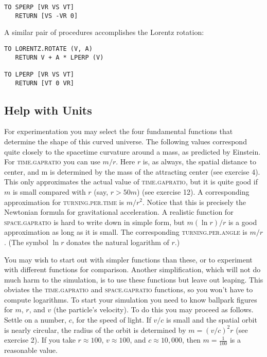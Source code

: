 \documentclass{book}
\begin{document}
\begin{verbatim}
TO SPERP [VR VS VT]
   RETURN [VS -VR 0]
\end{verbatim}
A similar pair of procedures accomplishes the Lorentz rotation:

\begin{verbatim}
TO LORENTZ.ROTATE (V, A)
   RETURN V + A * LPERP (V)

TO LPERP [VR VS VT]
   RETURN [VT 0 VR]
\end{verbatim}
\subsection{Help with Units}

For experimentation you may select the four fundamental functions that
determine the shape of this curved universe. The following values correspond quite closely to the spacetime curvature around a mass, as
predicted by Einstein. For \textsc{time}\textsc{.gapratio} you can use $m / r$. Here $r$
is, as always, the spatial distance to center, and m is determined by the
mass of the attracting center (see exercise 4). This only approximates
the actual value of \textsc{time}\textsc{.gapratio}, but it is quite good if $m$ is small
compared with $r$ (say, $r > 50m$) (see exercise 12). A corresponding approximation for \textsc{turning}\textsc{.per}\textsc{.time} is $m / r^2$. Notice that this is precisely
the Newtonian formula for gravitational acceleration. A realistic function for \textsc{space}\textsc{.gapratio} is hard to write down in simple form, but
$m(\ln r) / r$ is a good approximation as long as it is small. The corresponding \textsc{turning}\textsc{.per}.\textsc{angle} is $m / r$ . (The symbol $\ln r$ donates the natural
logarithm of $r$.)

You may wish to start out with simpler functions than these, or to experiment with different functions for comparison. Another simplification,
which will not do much harm to the simulation, is to use these functions but leave out leaping. This obviates the \textsc{time}\textsc{.gapratio} and
\textsc{space}\textsc{.gapratio} functions, so you won't have to compute logarithms.
To start your simulation you need to know ballpark figures for $m$, $r$,
and $v$ (the particle's velocity). To do this you may proceed as follows.
Settle on a number, $c$, for the speed of light. If $v / c$ is small and the
spatial orbit is nearly circular, the radius of the orbit is determined by
$m = (v/c)^2r$ (see exercise 2). If you take $r \approx 100$, $v \approx 100$, and $c \approx 10,000$, then $m = \frac {1} {100}$ is a reasonable value.
\end{document}
